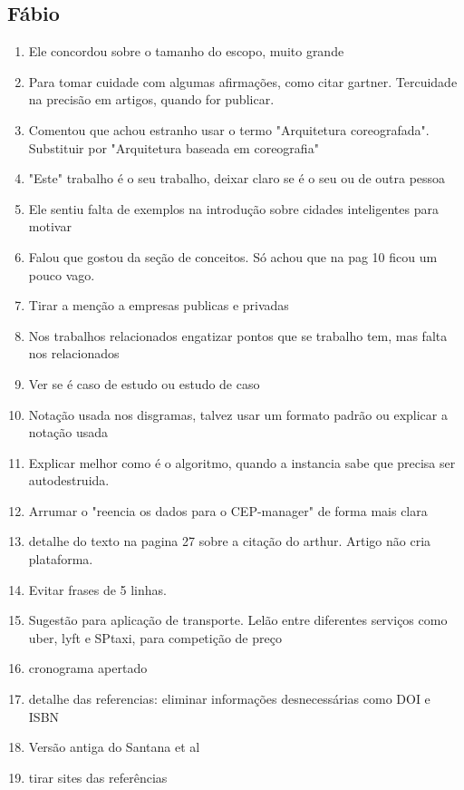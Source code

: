 \subsection{Fábio}
\begin{enumerate}
\item Ele concordou sobre o tamanho do escopo, muito grande
\item Para tomar cuidade com algumas afirmações, como citar gartner. Tercuidade na precisão em artigos, quando for publicar.
\item Comentou que achou estranho usar o termo "Arquitetura coreografada". Substituir por "Arquitetura baseada em coreografia"
\item "Este" trabalho é o seu trabalho, deixar claro se é o seu ou de outra pessoa
\item Ele sentiu falta de exemplos na introdução sobre cidades inteligentes para motivar
\item Falou que gostou da seção de conceitos. Só achou que na pag 10 ficou um pouco vago.
\item Tirar a menção a empresas publicas e privadas
\item Nos trabalhos relacionados engatizar pontos que se trabalho tem, mas falta nos relacionados
\item Ver se é caso de estudo ou estudo de caso
\item Notação usada nos disgramas, talvez usar um formato padrão ou explicar a notação usada
\item Explicar melhor como é o algoritmo, quando a instancia sabe que precisa ser autodestruida.
\item Arrumar o "reencia os dados para o CEP-manager" de forma mais clara
\item detalhe do texto na pagina 27 sobre a citação do arthur. Artigo não cria plataforma.
\item Evitar frases de 5 linhas.
\item Sugestão para aplicação de transporte. Lelão entre diferentes serviços como uber, lyft e SPtaxi, para competição de preço
\item cronograma apertado
\item detalhe das referencias: eliminar informações desnecessárias como DOI e ISBN
\item Versão antiga do Santana et al
\item tirar sites das referências 
\end{enumerate}

